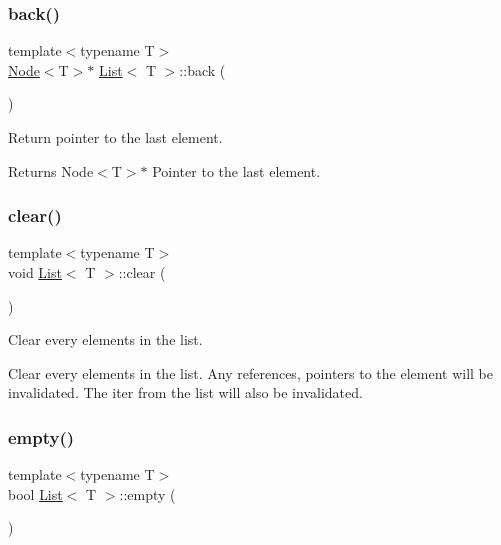 \subsubsection{\texorpdfstring{back()}{back()}}
{\footnotesize\ttfamily template$<$typename T$>$ \\
\hyperlink{structNode}{Node}$<$T$>$$\ast$ \hyperlink{classList}{List}$<$ T $>$\+::back (\begin{DoxyParamCaption}{ }\end{DoxyParamCaption})\hspace{0.3cm}{\ttfamily [inline]}}



Return pointer to the last element. 

\begin{DoxyReturn}{Returns}
Node$<$\+T$>$$\ast$ Pointer to the last element. 
\end{DoxyReturn}
\mbox{\label{classList_ae296516a252e11963dbf963727ce429a}} 
\subsubsection{\texorpdfstring{clear()}{clear()}}
{\footnotesize\ttfamily template$<$typename T$>$ \\
void \hyperlink{classList}{List}$<$ T $>$\+::clear (\begin{DoxyParamCaption}{ }\end{DoxyParamCaption})\hspace{0.3cm}{\ttfamily [inline]}}



Clear every elements in the list. 

Clear every elements in the list. Any references, pointers to the element will be invalidated. The {\ttfamily iter} from the list will also be invalidated. \mbox{\label{classList_a3737ca60365287ce663393d8c07d1a41}} 
\subsubsection{\texorpdfstring{empty()}{empty()}}
{\footnotesize\ttfamily template$<$typename T$>$ \\
bool \hyperlink{classList}{List}$<$ T $>$\+::empty (\begin{DoxyParamCaption}{ }\end{DoxyParamCaption})\hspace{0.3cm}{\ttfamily [inline]}}



